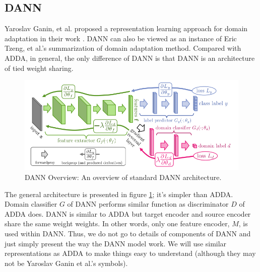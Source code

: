 \documentclass[conference]{IEEEtran}
\begin{document}
\subsection{DANN}
Yaroslav Ganin, et al. proposed a representation learning approach for domain adaptation in their work \cite{DANN1}. DANN can also be viewed as an instance of Eric Tzeng, et al.'s summarization of domain adaptation method. Compared with ADDA, in general, the only difference of DANN is that DANN is an architecture of tied weight sharing.
\begin{figure}
  \centering
  \includegraphics[width=.8\textwidth]{LDANN_theorem1.jpg}
  \caption{DANN Overview: An overview of standard DANN architecture.}
  \label{DANN_overview}
\end{figure}
The general architecture is presented in figure \ref{DANN_overview}; it's simpler than ADDA. Domain classifier $G$ of DANN performs similar function as discriminator $D$ of ADDA does. DANN is similar to ADDA but target encoder and source encoder share the same weight weights. In other words, only one feature encoder, $M$, is used within DANN. Thus, we do not go to details of components of DANN and just simply present the way the DANN model work. We will use similar representations as ADDA to make things easy to understand (although they may not be Yaroslav Ganin et al.'s symbols).
\end{document}
